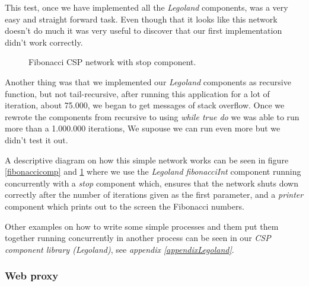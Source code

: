 \documentclass[a4paper,12pt]{article}
\begin{document}
This test, once we have implemented all the {\it Legoland}\cite{vintercsp}
components, was a very easy and straight forward task. Even though that it
looks like this network doesn't do much it was very useful to discover that
our first implementation didn't work correctly.

\begin{figure}[h]
  \begin{center}
  \end{center}
  \caption{Fibonacci CSP network with stop component.}
  \label{fibonacci}
\end{figure}

Another thing was that we implemented our {\it Legoland} components as
recursive function, but not tail-recursive, after running this application
for a lot of iteration, about 75.000, we began to get messages of stack
overflow. Once we rewrote the components from recursive to using {\it while true
do} we was able to run more than a 1.000.000 iterations, We supouse we can
run even more but we didn't test it out.

A descriptive diagram on how this simple network works can be seen in figure
\ref{fibonaccicomp} and \ref{fibonacci} where we use the {\it Legoland
fibonacciInt} component running concurrently with a {\it stop} component which,
ensures that the network shuts down correctly after the number of iterations
given as the first parameter, and a {\it printer} component which prints out to
the screen the Fibonacci numbers.

Other examples on how to write some simple processes and them put them together
running concurrently in another process can be seen in our {\it CSP component 
library (Legoland)}, see  {\it appendix \ref{appendixLegoland}}.

\subsubsection{Web proxy}
\end{document}
